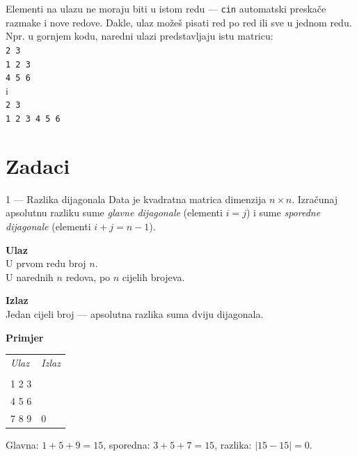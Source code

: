 \documentclass[11pt]{article}
\begin{document}
\begin{napomena}
    Elementi na ulazu ne moraju biti u istom redu — \texttt{cin} automatski
    preskače razmake i nove redove. Dakle, ulaz možeš pisati red po red ili
    sve u jednom redu.
    Npr. u gornjem kodu, naredni ulazi predstavljaju istu matricu: \\
    \texttt{2 3}\\
    \texttt{1 2 3}\\
    \texttt{4 5 6}\\
    i \\
    \texttt{2 3}\\
    \texttt{1 2 3 4 5 6}
\end{napomena}


\newpage

\section*{Zadaci}


\begin{zadatak}{1 — Razlika dijagonala}
Data je kvadratna matrica dimenzija $n \times n$.
Izračunaj apsolutnu razliku sume \emph{glavne dijagonale}
(elementi $i = j$) i sume \emph{sporedne dijagonale}
(elementi $i + j = n - 1$).

\medskip
\begin{minipage}[t]{0.45\textwidth}
\textbf{Ulaz}\\[2pt]
U prvom redu broj $n$.\\
U narednih $n$ redova, po $n$ cijelih brojeva.

\medskip
\textbf{Izlaz}\\[2pt]
Jedan cijeli broj — apsolutna razlika suma dviju dijagonala.
\end{minipage}
\hfill
\begin{minipage}[t]{0.48\textwidth}
\textbf{Primjer}\\[2pt]
\begin{tabular}{@{}ll@{}}
\textit{Ulaz} & \textit{Izlaz} \\
\begin{minipage}[t]{2.5cm}
\ttfamily\small
3\\
1 2 3\\
4 5 6\\
7 8 9
\end{minipage}
&
\begin{minipage}[t]{2cm}
\ttfamily\small
0
\end{minipage}
\end{tabular}

\medskip
Glavna: $1{+}5{+}9=15$, sporedna: $3{+}5{+}7=15$, razlika: $|15-15|=0$.
\end{minipage}
\end{zadatak}
\end{document}

